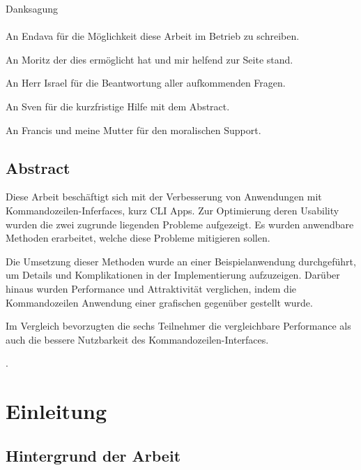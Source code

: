 \documentclass[oneside,bibliography=totocnumbered,BCOR=5mm]{scrbook}
\begin{document}
\thispagestyle{empty}
\vspace*{2.2cm}
\noindent
{\Huge Danksagung}\\
\vspace*{1.6cm} \\


An Endava für die Möglichkeit diese Arbeit im Betrieb zu schreiben.

\medskip

An Moritz der dies ermöglicht hat und mir helfend zur Seite stand.

\medskip

An Herr Israel für die Beantwortung aller aufkommenden Fragen.

\medskip

An Sven für die kurzfristige Hilfe mit dem Abstract.

\medskip

An Francis und meine Mutter für den moralischen Support.

\newpage
\thispagestyle{empty}

\section*{Abstract}

Diese Arbeit beschäftigt sich mit der Verbesserung von Anwendungen mit
Kommandozeilen-Inferfaces, kurz CLI Apps. Zur Optimierung deren Usability wurden
die zwei zugrunde liegenden Probleme aufgezeigt. Es wurden anwendbare Methoden
erarbeitet, welche diese Probleme mitigieren sollen.

Die Umsetzung dieser Methoden wurde an einer Beispielanwendung durchgeführt, um
Details und Komplikationen in der Implementierung aufzuzeigen. Darüber hinaus
wurden Performance und Attraktivität verglichen, indem die Kommandozeilen
Anwendung einer grafischen gegenüber gestellt wurde.

Im Vergleich bevorzugten die sechs Teilnehmer die vergleichbare Performance als
auch die bessere Nutzbarkeit des Kommandozeilen-Interfaces.

\clearpage
{}
\tableofcontents
.
\newpage

\chapter{Einleitung}
\label{sec:einleitung}

\section{Hintergrund der Arbeit}
\end{document}
